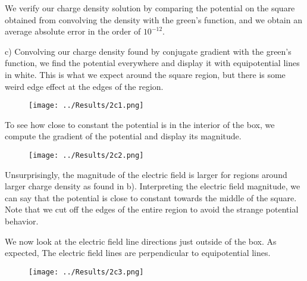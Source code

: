 \documentclass[]{article}
\begin{document}
We verify our charge density solution by comparing the potential on the square obtained from convolving the density with the green's function, and we obtain an average absolute error in the order of $10^{-12}$.

\newpage

c)
Convolving our charge density found by conjugate gradient with the green's function, we find the potential everywhere and display it with equipotential lines in white. This is what we expect around the square region, but there is some weird edge effect at the edges of the region.

\begin{figure}[h!]
	\centering
	\texttt{[image: ../Results/2c1.png]}
\end{figure}

To see how close to constant the potential is in the interior of the box, we compute the gradient of the potential and display its magnitude. 

\begin{figure}[h!]
	\centering
	\texttt{[image: ../Results/2c2.png]}
\end{figure}
Unsurprisingly, the magnitude of the electric field is larger for regions around larger charge density as found in b). Interpreting the electric field magnitude, we can say that the potential is close to constant towards the middle of the square. Note that we cut off the edges of the entire region to avoid the strange potential behavior.

We now look at the electric field line directions just outside of the box. As expected, The electric field lines are perpendicular to equipotential lines.

\begin{figure}[h!]
	\centering
	\texttt{[image: ../Results/2c3.png]}
\end{figure}
\end{document}

